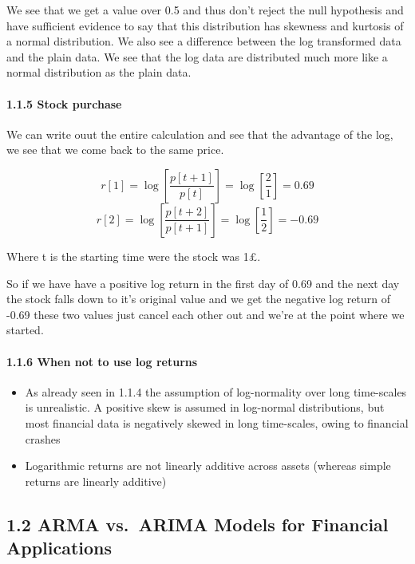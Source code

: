 \documentclass[11pt]{article}
\begin{document}
    We see that we get a value over 0.5 and thus don't reject the null
hypothesis and have sufficient evidence to say that this distribution
has skewness and kurtosis of a normal distribution. We also see a
difference between the log transformed data and the plain data. We see
that the log data are distributed much more like a normal distribution
as the plain data.

    \hypertarget{stock-purchase}{%
\paragraph{1.1.5 Stock purchase}\label{stock-purchase}}

    We can write ouut the entire calculation and see that the advantage of
the log, we see that we come back to the same price.

\[r[1] = \log[\frac{p[t+1]}{p[t]}] = \log[\frac{2}{1}] = 0.69 \]
\[r[2] = \log[\frac{p[t+2]}{p[t+1]}] = \log[\frac{1}{2}] = -0.69 \]

Where t is the starting time were the stock was 1£.

So if we have have a positive log return in the first day of 0.69 and
the next day the stock falls down to it's original value and we get the
negative log return of -0.69 these two values just cancel each other out
and we're at the point where we started.

    \hypertarget{when-not-to-use-log-returns}{%
\paragraph{1.1.6 When not to use log
returns}\label{when-not-to-use-log-returns}}

    \begin{itemize}
\item
  As already seen in 1.1.4 the assumption of log-normality over long
  time-scales is unrealistic. A positive skew is assumed in log-normal
  distributions, but most financial data is negatively skewed in long
  time-scales, owing to financial crashes
\item
  Logarithmic returns are not linearly additive across assets (whereas
  simple returns are linearly additive)
\end{itemize}

    \hypertarget{arma-vs.-arima-models-for-financial-applications}{%
\subsection{1.2 ARMA vs.~ARIMA Models for Financial
Applications}\label{arma-vs.-arima-models-for-financial-applications}}
\end{document}
